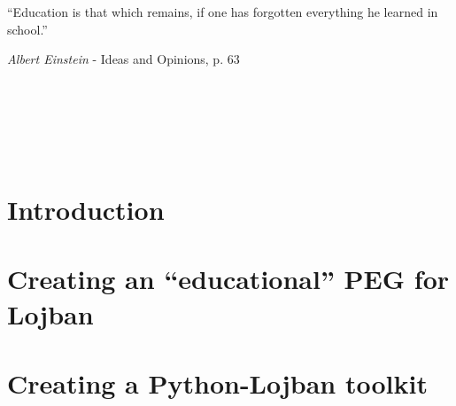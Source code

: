 

\usepackage[
    backend=bibtex, style=verbose, defernumbers=true, backref=true, block=none, hyperref=true
]{biblatex}

\setlength{}




\pagestyle{empty}
\newpage \ \newpage


\newpage \ \newpage

\renewcommand{\epigraphsize}{\large}
\renewcommand{\epigraphwidth}{10cm}
\vspace{3cm}
\epigraph{``Education is that which remains, if one has forgotten everything he learned in school.''}{\textit{Albert Einstein} - Ideas and Opinions, p. 63}
\newpage \ \newpage

%

\vspace{-1cm}
\setcounter{tocdepth}{3}
\tableofcontents
\newpage \ \newpage
\listoffigures
\newpage \ \newpage %

\makeatletter
\@openrightfalse
\makeatother
\pagestyle{fancy}
\part{Introduction}



\part{Creating an ``educational'' PEG for Lojban}


\part{Creating a Python-Lojban toolkit}



